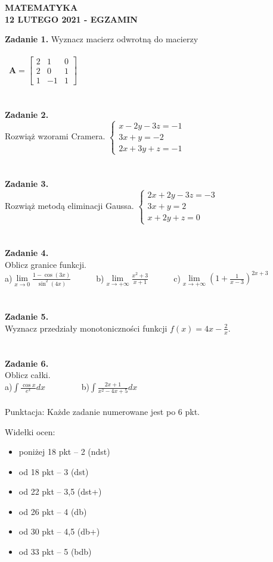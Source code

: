 \documentclass[12pt,a4paper]{report}
\begin{document}
\begin{center}

\textbf{MATEMATYKA \\12 LUTEGO 2021 - EGZAMIN}

\end{center}\textbf{Zadanie 1.} Wyznacz macierz odwrotną do macierzy \\\\\ $\mathbf{A} =\left[ \begin{array}{ccc}2 & 1& 0\\2& 0& 1\\1 & -1& 1\end{array} \right]$\\\\\\\textbf{Zadanie 2.}  \\Rozwiąż wzorami Cramera. $\left\{ \begin{array}{ll}x-2y-3z=-1\\ 3x+y=-2\\2x+3y+z=-1\end{array}\right.$\\\\\\\textbf{Zadanie 3.} \\Rozwiąż metodą eliminacji Gaussa. $\left\{ \begin{array}{ll}2x+2y-3z=-3\\3x+y=2\\x+2y+z=0\end{array} \right.$\\\\\\\textbf{Zadanie 4.} \\Oblicz granice funkcji.\\a)$\lim\limits_{x\to 0}\frac{1-\cos(3x)}{\sin^2(4x)}$\ \ \ \ \ \  b)$\lim\limits_{x\to +\infty}\frac{x^2+3}{x+1}$\ \ \ \ \ \ c)$\lim\limits_{x\to +\infty}\left( 1+\frac{1}{x-3}\right)^{2x+3}$\\\\\\\textbf{Zadanie 5.} \\Wyznacz przedziały monotoniczności funkcji $f(x)=4x-\frac{2}{x}$.\\\\\\\textbf{Zadanie 6.} \\Oblicz całki. \\a)$\int \frac{\cos x}{e^x} dx$ \ \ \ \ \ \ \ \ b)$\int \frac{2x+1}{x^2-4x+5} dx$\\\\Punktacja: Każde zadanie numerowane jest po 6 pkt.



Widełki ocen:

\begin{itemize}

\item poniżej 18 pkt -- 2 (ndst)

\item od 18 pkt -- 3 (dst)

\item od 22 pkt -- 3,5 (dst+)

\item od 26 pkt -- 4 (db)

\item od 30 pkt -- 4,5 (db+)

\item od 33 pkt -- 5 (bdb)

\end{itemize}
\end{document}
